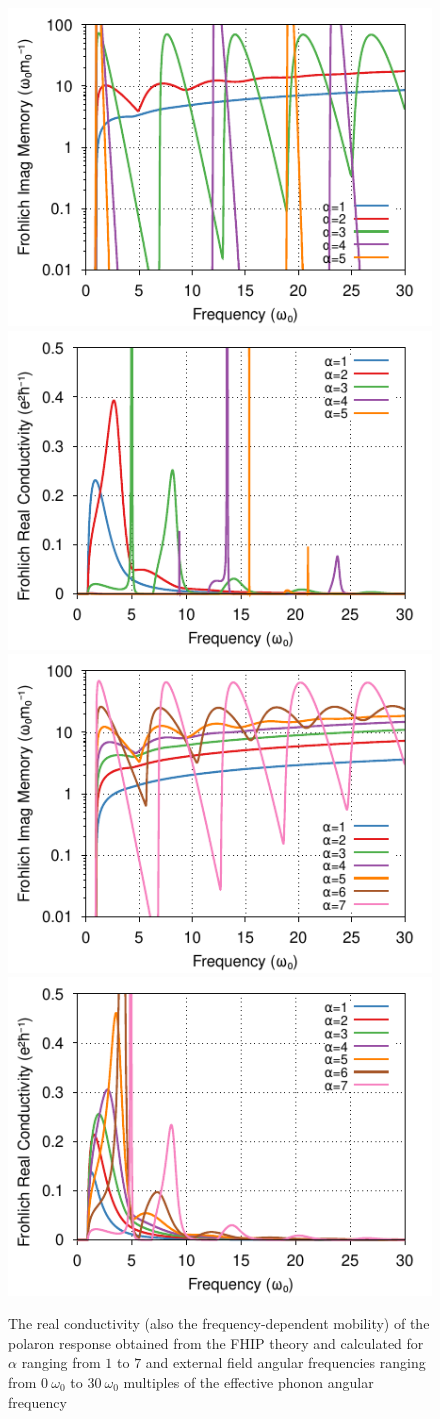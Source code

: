\begin{figure}[t]
    \centering
    \includegraphics[width=.49\textwidth]{chapters/background/figures/frohlich-2d-imag-memory-freq-COLOUR.pdf}
\includegraphics[width=.49\textwidth]{chapters/background/figures/frohlich-2d-real-conductivity-freq-COLOUR.pdf}
\includegraphics[width=.49\textwidth]{chapters/background/figures/frohlich-3d-imag-memory-freq-COLOUR.pdf}
\includegraphics[width=.49\textwidth]{chapters/background/figures/frohlich-3d-real-conductivity-freq-COLOUR.pdf}
    \caption{The real conductivity (also the frequency-dependent mobility) of the polaron response obtained from the FHIP theory and calculated for $\alpha$ ranging from $1$ to $7$ and external field angular frequencies ranging from $0\ \omega_0$ to $30\ \omega_0$ multiples of the effective phonon angular frequency}
    \label{fig:enter-label}
\end{figure}
\FloatBarrier

